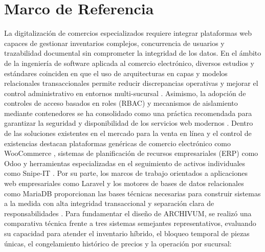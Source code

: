 \chapter{Marco de Referencia}
La digitalización de comercios especializados requiere integrar plataformas web capaces de gestionar inventarios complejos, concurrencia de usuarios y trazabilidad documental sin comprometer la integridad de los datos. En el ámbito de la ingeniería de software aplicada al comercio electrónico, diversos estudios y estándares coinciden en que el uso de arquitecturas en capas y modelos relacionales transaccionales permite reducir discrepancias operativas y mejorar el control administrativo en entornos multi-sucursal \cite{pressman2021, sommerville2020}. Asimismo, la adopción de controles de acceso basados en roles (RBAC) y mecanismos de aislamiento mediante contenedores se ha consolidado como una práctica recomendada para garantizar la seguridad y disponibilidad de los servicios web modernos \cite{owasp_top10, docker_compose}.
Dentro de las soluciones existentes en el mercado para la venta en línea y el control de existencias destacan plataformas genéricas de comercio electrónico como WooCommerce \cite{woocommerce_docs}, sistemas de planificación de recursos empresariales (ERP) como Odoo \cite{odoo_docs} y herramientas especializadas en el seguimiento de activos individuales como Snipe-IT \cite{snipeit_docs}. Por su parte, los marcos de trabajo orientados a aplicaciones web empresariales como Laravel y los motores de bases de datos relacionales como MariaDB proporcionan las bases técnicas necesarias para construir sistemas a la medida con alta integridad transaccional y separación clara de responsabilidades \cite{laravel_doc, mariadb_foundation, silberschatz2020}.
Para fundamentar el diseño de ARCHIVUM, se realizó una comparativa técnica frente a tres sistemas semejantes representativos, evaluando su capacidad para atender el inventario híbrido, el bloqueo temporal de piezas únicas, el congelamiento histórico de precios y la operación por sucursal:

